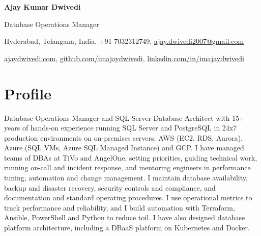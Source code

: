 \documentclass[10pt,a4paper]{article}
\begin{document}
\begin{center}
{\Huge\bfseries Ajay Kumar Dwivedi}

\vspace{4pt}
{\large\color{accent}Database Operations Manager}

\vspace{6pt}
Hyderabad, Telangana, India, +91 7032312749, \href{mailto:ajay.dwivedi2007@gmail.com}{ajay.dwivedi2007@gmail.com}

\vspace{2pt}
\href{https://ajaydwivedi.com/}{ajaydwivedi.com}, \href{https://github.com/imajaydwivedi}{github.com/imajaydwivedi}, \href{https://linkedin.com/in/imajaydwivedi/}{linkedin.com/in/imajaydwivedi}
\end{center}

\section{Profile}
Database Operations Manager and SQL Server Database Architect with 15+ years of hands-on experience running SQL Server and PostgreSQL in 24x7 production environments on on-premises servers, AWS (EC2, RDS, Aurora), Azure (SQL VMs, Azure SQL Managed Instance) and GCP. I have managed teams of DBAs at TiVo and AngelOne, setting priorities, guiding technical work, running on-call and incident response, and mentoring engineers in performance tuning, automation and change management. I maintain database availability, backup and disaster recovery, security controls and compliance, and documentation and standard operating procedures. I use operational metrics to track performance and reliability, and I build automation with Terraform, Ansible, PowerShell and Python to reduce toil. I have also designed database platform architecture, including a DBaaS platform on Kubernetes and Docker.
\end{document}
